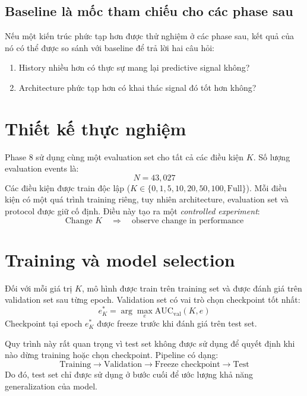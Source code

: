 \documentclass[12pt,a4paper]{article}
\begin{document}
\subsection{Baseline là mốc tham chiếu cho các phase sau}
Nếu một kiến trúc phức tạp hơn được thử nghiệm ở các phase sau, kết quả của nó có thể được so sánh với baseline để trả lời hai câu hỏi:
\begin{enumerate}[noitemsep]
    \item History nhiều hơn có thực sự mang lại predictive signal không?
    \item Architecture phức tạp hơn có khai thác signal đó tốt hơn không?
\end{enumerate}

\section{Thiết kế thực nghiệm}

Phase 8 sử dụng cùng một evaluation set cho tất cả các điều kiện $K$. Số lượng evaluation events là:
\[
N = 43,027
\]
Các điều kiện được train độc lập ($K \in \{0, 1, 5, 10, 20, 50, 100, \mathrm{Full}\}$). Mỗi điều kiện có một quá trình training riêng, tuy nhiên architecture, evaluation set và protocol được giữ cố định. Điều này tạo ra một \textit{controlled experiment}:
\[
\boxed{ \text{Change } K \quad \Rightarrow \quad \text{observe change in performance} }
\]

\section{Training và model selection}

Đối với mỗi giá trị $K$, mô hình được train trên training set và được đánh giá trên validation set sau từng epoch. Validation set có vai trò chọn checkpoint tốt nhất:
\[
e^*_K = \arg\max_e \mathrm{AUC}_{\mathrm{val}}(K, e)
\]
Checkpoint tại epoch $e^*_K$ được freeze trước khi đánh giá trên test set.

Quy trình này rất quan trọng vì test set không được sử dụng để quyết định khi nào dừng training hoặc chọn checkpoint. Pipeline có dạng:
\[
\text{Training} \rightarrow \text{Validation} \rightarrow \text{Freeze checkpoint} \rightarrow \text{Test}
\]
Do đó, test set chỉ được sử dụng ở bước cuối để ước lượng khả năng generalization của model.
\end{document}

